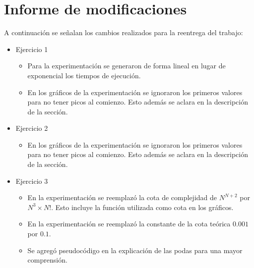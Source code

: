 \section*{Informe de modificaciones}

A continuación se señalan los cambios realizados para la reentrega del trabajo:

\begin{itemize}
	\item{
		Ejercicio 1
		\begin{itemize}
			\item Para la experimentación se generaron de forma lineal en lugar
			de exponencial los tiempos de ejecución.
			\item En los gráficos de la experimentación se ignoraron los primeros
			valores para no tener picos al comienzo. Esto además se aclara en la
			descripción de la sección.
		\end{itemize}
	}
	\item{
		Ejercicio 2
		\begin{itemize}
			\item En los gráficos de la experimentación se ignoraron los primeros
			valores para no tener picos al comienzo. Esto además se aclara en la
			descripción de la sección.
		\end{itemize}
	}
	\item{
		Ejercicio 3
		\begin{itemize}
			\item En la experimentación se reemplazó la cota de complejidad de $N^{N+2}$ por $N^3 \times N!$. Esto incluye la función utilizada como cota en los gráficos.
			\item En la experimentación se reemplazó la constante de la cota teórica $0.001$ por $0.1$.
			\item Se agregó pseudocódigo en la explicación de las podas para una mayor comprensión.
		\end{itemize}
	}
\end{itemize}
